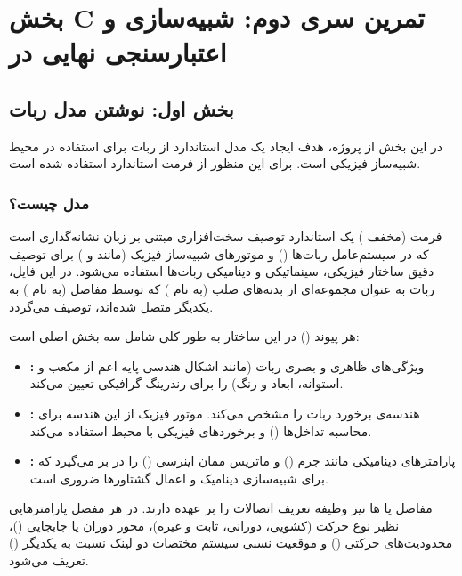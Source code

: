\documentclass{article}
\begin{document}


\tableofcontents \clearpage
\listoffigures \clearpage
\listoftables \clearpage
\newpage

\section{بخش C تمرین سری دوم: شبیه‌سازی و اعتبارسنجی نهایی در }

\subsection{بخش اول: نوشتن مدل  ربات}

در این بخش از پروژه، هدف ایجاد یک مدل استاندارد از ربات برای استفاده در محیط شبیه‌ساز فیزیکی  است. برای این منظور از فرمت استاندارد  استفاده شده است.

\subsubsection*{مدل  چیست؟}
فرمت  (مخفف ) یک استاندارد توصیف سخت‌افزاری مبتنی بر زبان نشانه‌گذاری  است که در سیستم‌عامل ربات‌ها () و موتورهای شبیه‌ساز فیزیک (مانند  و ) برای توصیف دقیق ساختار فیزیکی، سینماتیکی و دینامیکی ربات‌ها استفاده می‌شود. در این فایل، ربات به عنوان مجموعه‌ای از بدنه‌های صلب (به نام ) که توسط مفاصل (به نام ) به یکدیگر متصل شده‌اند، توصیف می‌گردد.

هر پیوند () در این ساختار به طور کلی شامل سه بخش اصلی است:
\begin{itemize}
	\item \textbf{:} ویژگی‌های ظاهری و بصری ربات (مانند اشکال هندسی پایه اعم از مکعب و استوانه، ابعاد و رنگ) را برای رندرینگ گرافیکی تعیین می‌کند.
	\item \textbf{:} هندسه‌ی برخورد ربات را مشخص می‌کند. موتور فیزیک از این هندسه برای محاسبه تداخل‌ها () و برخوردهای فیزیکی با محیط استفاده می‌کند.
	\item \textbf{:} پارامترهای دینامیکی مانند جرم () و ماتریس ممان اینرسی () را در بر می‌گیرد که برای شبیه‌سازی دینامیک و اعمال گشتاورها ضروری است.
\end{itemize}

مفاصل یا ها نیز وظیفه تعریف اتصالات را بر عهده دارند. در هر مفصل پارامترهایی نظیر نوع حرکت (کشویی، دورانی، ثابت و غیره)، محور دوران یا جابجایی ()، محدودیت‌های حرکتی () و موقعیت نسبی سیستم مختصات دو لینک نسبت به یکدیگر () تعریف می‌شود.
\end{document}
